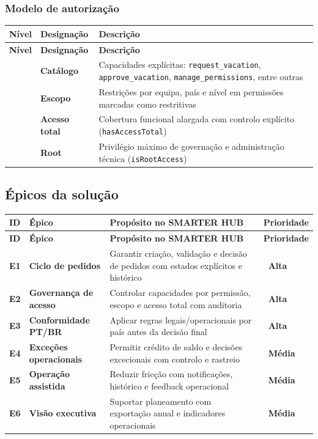 \documentclass[11pt,a4paper,twoside]{article}
\newcommand{\taghi}  {{\setlength{\fboxsep}{1.5pt}\colorbox{TAGHI}  {\scriptsize\sffamily\bfseries\color{white}~Alta~}}}
\newcommand{\tagmed} {{\setlength{\fboxsep}{1.5pt}\colorbox{TAGMED} {\scriptsize\sffamily\bfseries\color{white}~Média~}}}
\newcommand{\tH}[1]{\textbf{\sffamily\small\color{white}#1}}
\newcommand{\theadrow}{\rowcolor{ACCENT}}
\begin{document}
\subsubsection{Modelo de autorização}

\begin{longtable}{>{\small\centering\arraybackslash}p{1.6cm} >{\small\bfseries}p{3.0cm} >{\small}p{8.6cm}}
\theadrow
\tH{Nível} & \tH{Designação} & \tH{Descrição} \\
\midrule
\endfirsthead
\theadrow
\tH{Nível} & \tH{Designação} & \tH{Descrição} \\
\midrule
\endhead
1 & Catálogo & Capacidades explícitas: \texttt{request\_vacation}, \texttt{approve\_vacation}, \texttt{manage\_permissions}, entre outras \\
2 & Escopo & Restrições por equipa, país e nível em permissões marcadas como restritivas \\
3 & Acesso total & Cobertura funcional alargada com controlo explícito (\texttt{hasAccessTotal}) \\
4 & Root & Privilégio máximo de governação e administração técnica (\texttt{isRootAccess}) \\
\bottomrule
\end{longtable}

\subsection{Épicos da solução}

\begin{longtable}{>{\small\centering\arraybackslash\bfseries}p{1.2cm} >{\small\bfseries}p{3.8cm} >{\small}p{7.0cm} >{\small\centering\arraybackslash}p{1.8cm}}
\theadrow
\tH{ID} & \tH{Épico} & \tH{Propósito no SMARTER HUB} & \tH{Prioridade} \\
\midrule
\endfirsthead
\theadrow
\tH{ID} & \tH{Épico} & \tH{Propósito no SMARTER HUB} & \tH{Prioridade} \\
\midrule
\endhead
E1 & Ciclo de pedidos & Garantir criação, validação e decisão de pedidos com estados explícitos e histórico & \taghi \\
E2 & Governança de acesso & Controlar capacidades por permissão, escopo e acesso total com auditoria & \taghi \\
E3 & Conformidade PT/BR & Aplicar regras legais/operacionais por país antes da decisão final & \taghi \\
E4 & Exceções operacionais & Permitir crédito de saldo e decisões excecionais com controlo e rastreio & \tagmed \\
E5 & Operação assistida & Reduzir fricção com notificações, histórico e feedback operacional & \tagmed \\
E6 & Visão executiva & Suportar planeamento com exportação anual e indicadores operacionais & \tagmed \\
\bottomrule
\end{longtable}
\end{document}
